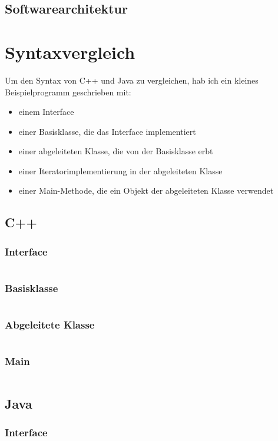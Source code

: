\documentclass[12pt]{scrartcl}
\begin{document}
\subsection{Softwarearchitektur}

\pagebreak
\section{Syntaxvergleich}\label{sec:syntaxvergleich}
Um den Syntax von C++ und Java zu vergleichen, hab ich ein kleines Beispielprogramm geschrieben mit:
\begin{itemize}
	\item einem Interface
	\item einer Basisklasse, die das Interface implementiert
	\item einer abgeleiteten Klasse, die von der Basisklasse erbt
	\item einer Iteratorimplementierung in der abgeleiteten Klasse
	\item einer Main-Methode, die ein Objekt der abgeleiteten Klasse verwendet
\end{itemize}

\subsection{C++}
\subsubsection{Interface}
\inputminted{cpp}{cpp/interface.h}
\subsubsection{Basisklasse}
\inputminted{cpp}{cpp/baseclass.h}
\subsubsection{Abgeleitete Klasse}
\inputminted{cpp}{cpp/derivedclass.h}
\subsubsection{Main}
\inputminted{cpp}{cpp/main.cpp}
\pagebreak

\subsection{Java}
\subsubsection{Interface}
\inputminted{java}{java/src/main/java/javademo/Interface.java}
\end{document}
